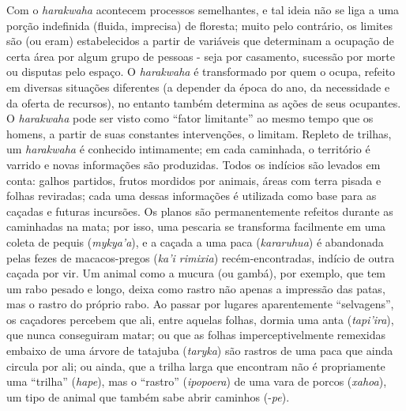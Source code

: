 Com o \emph{harakwaha} acontecem processos semelhantes, e tal ideia não
se liga a uma porção indefinida (fluida, imprecisa) de floresta; muito
pelo contrário, os limites são (ou eram) estabelecidos a partir de
variáveis que determinam a ocupação de certa área por algum grupo de
pessoas - seja por casamento, sucessão por morte ou disputas pelo
espaço. O \emph{harakwaha} é transformado por quem o ocupa, refeito em
diversas situações diferentes (a depender da época do ano, da
necessidade e da oferta de recursos), no entanto também determina as
ações de seus ocupantes. O \emph{harakwaha} pode ser visto como ``fator
limitante'' ao mesmo tempo que os homens, a partir de suas constantes
intervenções, o limitam. Repleto de trilhas, um \emph{harakwaha} é
conhecido intimamente; em cada caminhada, o território é varrido e novas
informações são produzidas. Todos os indícios são levados em conta:
galhos partidos, frutos mordidos por animais, áreas com terra pisada e
folhas reviradas; cada uma dessas informações é utilizada como base para
as caçadas e futuras incursões. Os planos são permanentemente refeitos
durante as caminhadas na mata; por isso, uma pescaria se transforma
facilmente em uma coleta de pequis (\emph{mykya'a}), e a caçada a uma
paca (\emph{kararuhua}) é abandonada pelas fezes de macacos-pregos
(\emph{ka'i rimixia}) recém-encontradas, indício de outra caçada por
vir. Um animal como a mucura (ou gambá), por exemplo, que tem um rabo
pesado e longo, deixa como rastro não apenas a impressão das patas, mas
o rastro do próprio rabo. Ao passar por lugares aparentemente
``selvagens'', os caçadores percebem que ali, entre aquelas folhas,
dormia uma anta (\emph{tapi'ira}), que nunca conseguiram matar; ou que
as folhas imperceptivelmente remexidas embaixo de uma árvore de tatajuba
(\emph{taryka}) são rastros de uma paca que ainda circula por ali; ou
ainda, que a trilha larga que encontram não é propriamente uma
``trilha'' (\emph{hape}), mas o ``rastro'' (\emph{ipopoera}) de uma vara
de porcos (\emph{xahoa}), um tipo de animal que também sabe abrir
caminhos (-\emph{pe}).

